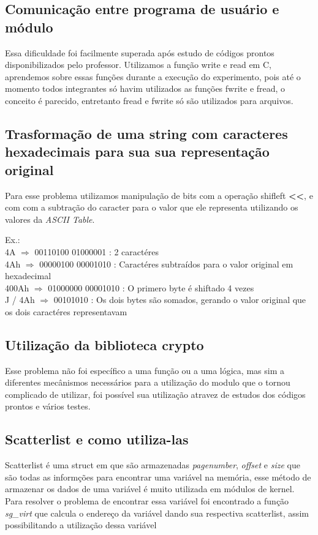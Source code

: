 \subsection{Comunicação entre programa de usuário e módulo}

Essa dificuldade foi facilmente superada após estudo de códigos prontos disponibilizados pelo professor.
Utilizamos a função write e read em C, aprendemos sobre essas funções durante a execução do experimento, pois até o momento todos integrantes só havim utilizados as funções fwrite e fread, o conceito é parecido, entretanto fread e fwrite só são utilizados para arquivos.

\vfill

\subsection{Trasformação de uma string com caracteres hexadecimais para sua sua representação original}

Para esse problema utilizamos manipulação de bits com a operação shifleft \textbf{\textless\textless}, e com com a subtração do caracter para o valor que ele representa utilizando os valores da \textit{ASCII Table}.
\begin{flushleft}
\begin{em}
Ex.:\\
4A      $\Rightarrow$ 00110100 01000001 : 2 caractéres\\
4Ah     $\Rightarrow$ 00000100 00001010 : Caractéres subtraídos para o valor original em hexadecimal\\
400Ah   $\Rightarrow$ 01000000 00001010 : O primero byte é shiftado 4 vezes\\
J / 4Ah $\Rightarrow$ 00101010          : Os dois bytes são somados, gerando o valor original que os dois caractéres representavam \\ 
\end{em}
\end{flushleft}

\subsection{Utilização da biblioteca crypto}
Esse problema não foi específico a uma função ou a uma lógica, mas sim a diferentes mecânismos necessários para a utilização do modulo que o tornou complicado de utilizar, foi possível sua utilização atravez de estudos dos códigos prontos e vários testes. 

\subsection{Scatterlist e como utiliza-las}
Scatterlist é uma struct em que são armazenadas \textit{pagenumber}, \textit{offset} e \textit{size} que são todas as informções para encontrar uma variável na memória, esse método de armazenar os dados de uma variável é muito utilizada em módulos de kernel.\\
Para resolver o problema de encontrar essa variável foi encontrado a função \textit{sg\_virt} que calcula o endereço da variável dando sua respectiva scatterlist, assim possibilitando a utilização dessa variável
\vfill
\clearpage

